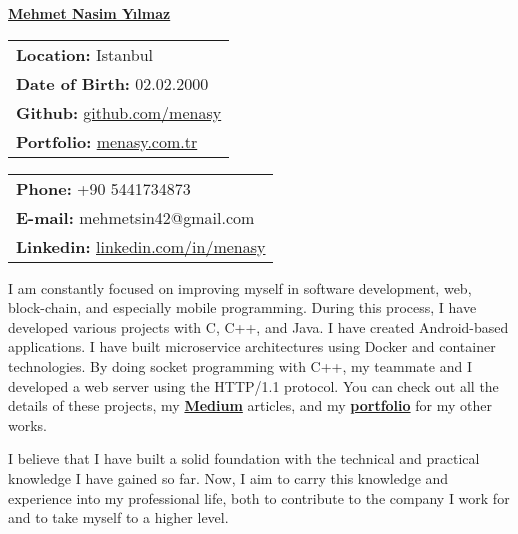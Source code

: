 \documentclass[a4paper,11pt]{article}
\begin{document}
\vspace*{-6.5em} 
\begin{center}
    \href{https://menasy.com.tr/}{\LARGE \textbf{Mehmet Nasim Yılmaz}}
\end{center}
\vspace*{0.5em} 
\noindent
\begin{minipage}[t]{0.48\textwidth}
    \begin{tabular}{@{}l}
        \textbf{Location:} Istanbul \\
        \textbf{Date of Birth:} 02.02.2000 \\
        \textbf{Github:} \href{https://github.com/menasy}{github.com/menasy} \\
        \textbf{Portfolio:} \href{https://menasy.com.tr/}{menasy.com.tr} \\
    \end{tabular}
\end{minipage}%
\hfill
\begin{minipage}[t]{0.48\textwidth}
    \raggedleft
    \begin{tabular}{@{}l}
        \textbf{Phone:} +90 5441734873 \\
        \textbf{E-mail:} mehmetsin42@gmail.com \\
        \textbf{Linkedin:} \href{https://linkedin.com/in/menasy}{linkedin.com/in/menasy} \\
    \end{tabular}
\end{minipage}

\vspace{0.7em}

I am constantly focused on improving myself in software development, web, block-chain, and especially mobile programming. During this process, I have developed various projects with C, C++, and Java. I have created Android-based applications. I have built microservice architectures using Docker and container technologies. By doing socket programming with C++, my teammate and I developed a web server using the HTTP/1.1 protocol. You can check out all the details of these projects, my \textbf{\href{https://medium.com/@menasy}{Medium}} articles, and my \textbf{\href{https://menasy.com.tr/}{portfolio}} for my other works.
\vspace{-0.5em}

I believe that I have built a solid foundation with the technical and practical knowledge I have gained so far. Now, I aim to carry this knowledge and experience into my professional life, both to contribute to the company I work for and to take myself to a higher level.
\vspace{-0.5em}
\end{document}
